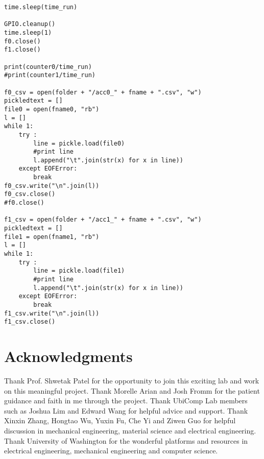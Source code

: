 \documentclass{sigchi}
\begin{document}
\begin{lstlisting}
time.sleep(time_run)

GPIO.cleanup()
time.sleep(1)
f0.close()
f1.close()

print(counter0/time_run)
#print(counter1/time_run)

f0_csv = open(folder + "/acc0_" + fname + ".csv", "w")
pickledtext = []
file0 = open(fname0, "rb")
l = []
while 1:
    try :
        line = pickle.load(file0)
        #print line
        l.append("\t".join(str(x) for x in line))
    except EOFError:
        break
f0_csv.write("\n".join(l))
f0_csv.close()
#f0.close()

f1_csv = open(folder + "/acc1_" + fname + ".csv", "w")
pickledtext = []
file1 = open(fname1, "rb")
l = []
while 1:
    try :
        line = pickle.load(file1)
        #print line
        l.append("\t".join(str(x) for x in line))
    except EOFError:
        break
f1_csv.write("\n".join(l))
f1_csv.close()
\end{lstlisting}


\section{Acknowledgments}

Thank Prof. Shwetak Patel for the opportunity to join this exciting lab and work on this meaningful project. Thank Morelle Arian and Josh Fromm for the patient guidance and faith in me through the project. Thank UbiComp Lab members such as Joshua Lim and Edward Wang for helpful advice and support. Thank Xinxin Zhang, Hongtao Wu, Yuxin Fu, Che Yi and Ziwen Guo for helpful discussion in mechanical engineering, material science and electrical engineering. Thank University of Washington for the wonderful platforms and resources in electrical engineering, mechanical engineering and computer science. 

\balance{}




\end{document}
